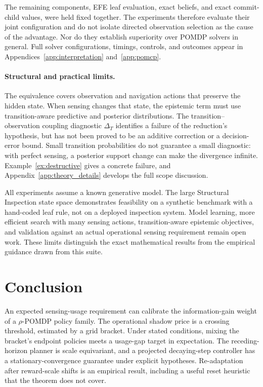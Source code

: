 The remaining components, EFE leaf evaluation, exact beliefs, and exact commit-child values, were held fixed together. The experiments therefore evaluate their joint configuration and do not isolate directed observation selection as the cause of the advantage. Nor do they establish superiority over POMDP solvers in general. Full solver configurations, timings, controls, and outcomes appear in Appendices~\ref{app:interpretation} and~\ref{app:pomcp}.

\paragraph{Structural and practical limits.}
The equivalence covers observation and navigation actions that preserve the hidden state. When sensing changes that state, the epistemic term must use transition-aware predictive and posterior distributions. The transition--observation coupling diagnostic $\Delta_T$ identifies a failure of the reduction's hypothesis, but has not been proved to be an additive correction or a decision-error bound. Small transition probabilities do not guarantee a small diagnostic: with perfect sensing, a posterior support change can make the divergence infinite. Example~\ref{ex:destructive} gives a concrete failure, and Appendix~\ref{app:theory_details} develops the full scope discussion.

All experiments assume a known generative model. The large Structural Inspection state space demonstrates feasibility on a synthetic benchmark with a hand-coded leaf rule, not on a deployed inspection system. Model learning, more efficient search with many sensing actions, transition-aware epistemic objectives, and validation against an actual operational sensing requirement remain open work. These limits distinguish the exact mathematical results from the empirical guidance drawn from this suite.

\section{Conclusion}

An expected sensing-usage requirement can calibrate the information-gain weight of a $\rho$-POMDP policy family. The operational shadow price is a crossing threshold, estimated by a grid bracket. Under stated conditions, mixing the bracket's endpoint policies meets a usage-gap target in expectation. The receding-horizon planner is scale equivariant, and a projected decaying-step controller has a stationary-convergence guarantee under explicit hypotheses. Re-adaptation after reward-scale shifts is an empirical result, including a useful reset heuristic that the theorem does not cover.

